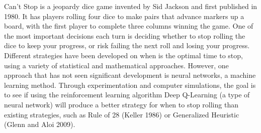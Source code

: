 
\bigskip

\noindent Can’t Stop is a jeopardy dice game invented by Sid Jackson and first published in 1980. It has players rolling four dice to make pairs that advance markers up a board, with the first player to complete three columns winning the game. 
One of the most important decisions each turn is deciding whether to stop rolling the dice to keep your progress, or risk failing the next roll and losing your progress. 
Different strategies have been developed on when is the optimal time to stop, using a variety of statistical and mathematical approaches. 
However, one approach that has not seen significant development is neural networks, a machine learning method. 
Through experimentation and computer simulations, 
the goal is to see if using the reinforcement learning algorithm Deep Q-Learning (a type of neural network) will produce a better strategy for when to stop rolling than existing strategies, 
such as Rule of 28 (Keller 1986) or Generalized Heuristic (Glenn and Aloi 2009).
